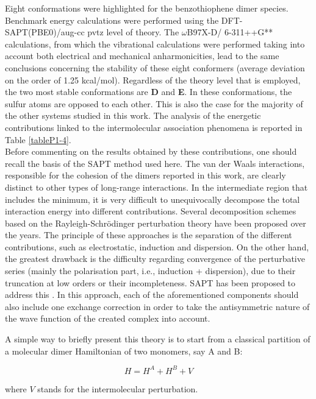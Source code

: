 		
		Eight conformations were highlighted for the benzothiophene dimer species. Benchmark energy calculations were performed using the DFT-SAPT(PBE0)/aug-cc pvtz level of theory. The $\omega$B97X-D/ 6-311++G** calculations, from which the vibrational calculations were performed taking into account both electrical and mechanical anharmonicities, lead to the same conclusions concerning the stability of these eight conformers (average deviation on the order of 1.25 kcal/mol). Regardless of the theory level that is employed, the two most stable conformations are \textbf{D} and \textbf{E}. In these conformations, the sulfur atoms are opposed to each other. This is also the case for the majority of the other systems studied in this work. The analysis of the energetic contributions linked to the intermolecular association phenomena is reported in Table \ref{tableP1-4}.\\
		
		Before commenting on the results obtained by these contributions, one should recall the basis of the SAPT method used here. The van der Waals interactions, responsible for the cohesion of the dimers reported in this work, are clearly distinct to other types of long-range interactions. In the intermediate region that includes the minimum, it is very difficult to unequivocally decompose the total interaction energy into different contributions. Several decomposition schemes based on the Rayleigh-Schr\"{o}dinger perturbation theory have been proposed over the years. The principle of these approaches is the separation of the different contributions, such as electrostatic, induction and dispersion. On the other hand, the greatest drawback is the difficulty regarding convergence of the perturbative series (mainly the polarisation part, i.e., induction + dispersion), due to their truncation at low orders or their incompleteness. SAPT has been proposed to address this \cite{jeziorski1994perturbation}. In this approach, each of the aforementioned components should also include one exchange correction in order to take the antisymmetric nature of the wave function of the created complex into account. 
		
		A simple way to briefly present this theory is to start from a classical partition of a molecular dimer Hamiltonian of two monomers, say A and B:
		
		\begin{equation}
		H = H^{A} + H^{B} + V
		\end{equation}
		
		where $V$ stands for the intermolecular perturbation.\\
		
